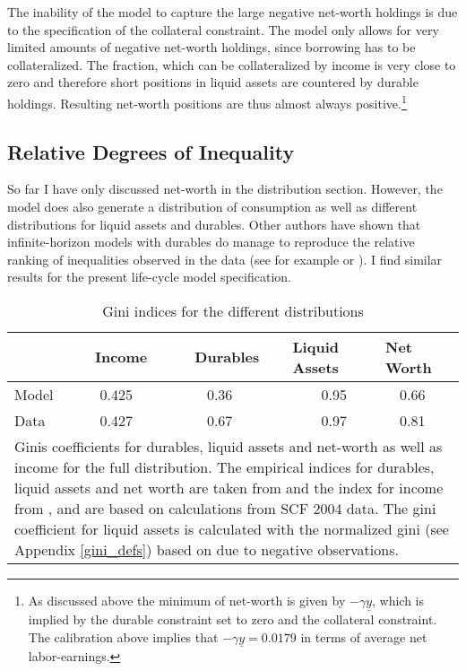 \documentclass[a4paper,12pt,legno]{article}
\begin{document}
The inability of the model to capture the large negative net-worth holdings is due to the specification of the collateral constraint. The model only allows for very limited amounts of negative net-worth holdings, since borrowing has to be collateralized. The fraction, which can be collateralized by income is very close to zero and therefore short positions in liquid assets are countered by durable holdings. Resulting net-worth positions are thus almost always positive.\footnote{As discussed above the minimum of net-worth is given by $-\gamma\underline{y}$, which is implied by the durable constraint set to zero and the collateral constraint. The calibration above implies that $-\gamma\underline{y} = 0.0179$ in terms of average net labor-earnings.} 

\subsection{Relative Degrees of Inequality}
So far I have only discussed net-worth in the distribution section. However, the model does also generate a distribution of consumption as well as different distributions for liquid assets and durables. Other authors have shown that infinite-horizon models with durables do manage to reproduce the relative ranking of inequalities observed in the data (see for example \cite{hintermaier2010} or \cite{diaz2010}). I find similar results for the present life-cycle model specification.


\begin{table}[!htbp]
\centering
\caption{Gini indices for the different distributions}
\label{Gini_Ranking}
\begin{tabular}{@{}lllll@{}}
\toprule
       & \ \ Income & \ \ Durables & Liquid Assets & Net Worth \\ \midrule
Model      &  \ \ \ 0.425 & \ \ \ \ 0.36   & \ \ \ \ 0.95        & \ \ 0.66    \\ \midrule
Data        & \ \ \ 0.427  & \ \ \ \ 0.67     & \ \ \ \ 0.97          & \ \ 0.81      \\ \bottomrule
\multicolumn{5}{l}{%
  \begin{minipage}{10.5cm}%
    \small Ginis coefficients for durables, liquid assets and net-worth as well as income for the full distribution. The empirical indices for durables, liquid assets and net worth are taken from \cite{hintermaier2010} and the index for income from \cite{hintermaier2011}, and are based on calculations from SCF 2004 data. The gini coefficient for liquid assets is calculated with the normalized gini (see Appendix \ref{gini_defs}) based on \cite{chen1982} due to negative observations. 
  \end{minipage}%
}\\
\end{tabular}
\end{table}
\end{document}
